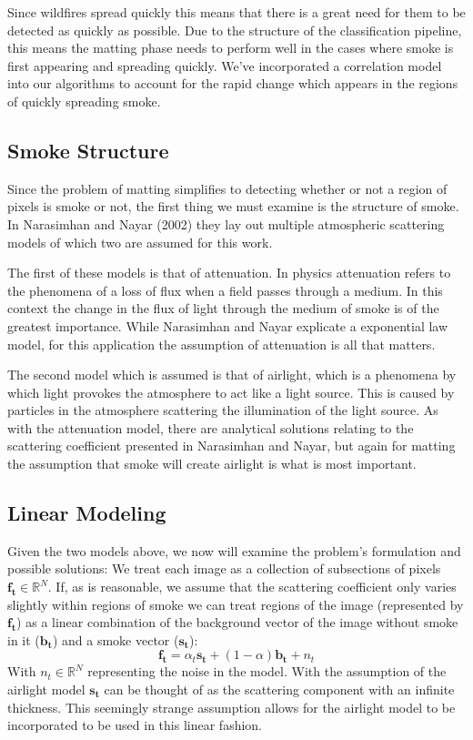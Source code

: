 \documentclass[12pt]{article}
\begin{document}
Since wildfires spread quickly this means that there is a great need for them to be detected as quickly as possible. Due to the structure of the classification pipeline, this means the matting phase needs to perform well in the cases where smoke is first appearing and spreading quickly. We've incorporated a correlation model into our algorithms to account for the rapid change which appears in the regions of quickly spreading smoke.      

\subsection{Smoke Structure}

Since the problem of matting simplifies to detecting whether or not a region of pixels is smoke or not, the first thing we must examine is the structure of smoke. In Narasimhan and Nayar (2002)\cite{NN} they lay out multiple atmospheric scattering models of which two are assumed for this work.  

The first of these models is that of attenuation. In physics attenuation refers to the phenomena of a loss of flux when a field passes through a medium. In this context the change in the flux of light through the medium of smoke is of the greatest importance. While  Narasimhan and Nayar explicate a exponential law model, for this application the assumption of attenuation is all that matters. 

The second model which is assumed is that of airlight, which is a phenomena by which light provokes the atmosphere to act like a light source. This is caused by particles in the atmosphere scattering the illumination of the light source. As with the attenuation model, there are analytical solutions relating to the scattering coefficient presented in Narasimhan and Nayar, but again for matting the assumption that smoke will create airlight is what is most important. 

\subsection{Linear Modeling}
Given the two models above, we now will examine the problem's formulation and possible solutions: 
We treat each image as a collection of subsections of pixels $\boldsymbol{f_{t}} \in \mathbb{R}^{N} $. If, as is reasonable, we assume that the scattering coefficient only varies slightly within regions of smoke we can treat regions of the image (represented by $\boldsymbol{f_{t}}$) as a linear combination of the background vector of the image without smoke in it ($\boldsymbol{b_{t}}$) and a smoke vector ($\boldsymbol{s_{t}}$):
\begin{equation}
\boldsymbol{f_{t}} = \alpha_{t}\boldsymbol{s_{t}} + (1-\alpha)\boldsymbol{b_{t}} + {n_{t}}  
\end{equation}
With ${n_{t}} \in \mathbb{R}^{N} $ representing the noise in the model. With the assumption of the airlight model $\boldsymbol{s_{t}}$ can be thought of as the scattering component with an infinite thickness. This seemingly strange assumption allows for the airlight model to be incorporated to be used in this linear fashion. 
\end{document}
